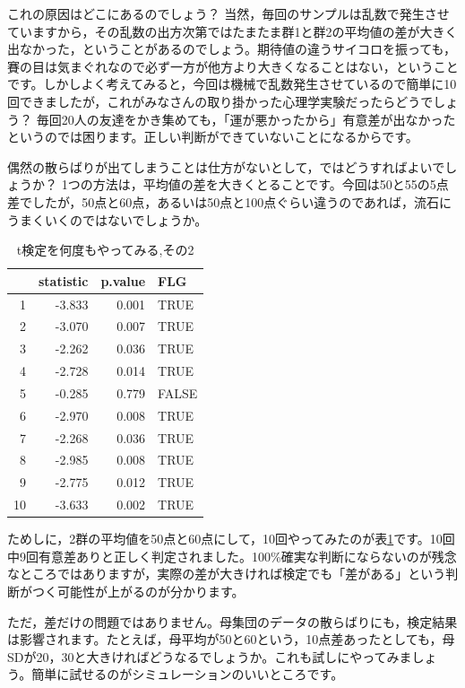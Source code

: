 \documentclass{ltjsarticle}
\begin{document}
{これの原因はどこにあるのでしょう？ 当然，毎回のサンプルは乱数で発生させていますから，その乱数の出方次第ではたまたま群1と群2の平均値の差が大きく出なかった，ということがあるのでしょう。期待値の違うサイコロを振っても，賽の目は気まぐれなので必ず一方が他方より大きくなることはない，ということです。しかしよく考えてみると，今回は機械で乱数発生させているので簡単に10回できましたが，これがみなさんの取り掛かった心理学実験だったらどうでしょう？ 毎回20人の友達をかき集めても，「運が悪かったから」有意差が出なかったというのでは困ります。正しい判断ができていないことになるからです。

偶然の散らばりが出てしまうことは仕方がないとして，ではどうすればよいでしょうか？ 1つの方法は，平均値の差を大きくとることです。今回は50と55の5点差でしたが，50点と60点，あるいは50点と100点ぐらい違うのであれば，流石にうまくいくのではないでしょうか。


\begin{table}[ht]
	\centering
	\caption{t検定を何度もやってみる,その2}
	\begin{tabular}{rrrl}
		\hline
		   & statistic & p.value & FLG   \\
		\hline
		1  & -3.833    & 0.001   & TRUE  \\
		2  & -3.070    & 0.007   & TRUE  \\
		3  & -2.262    & 0.036   & TRUE  \\
		4  & -2.728    & 0.014   & TRUE  \\
		5  & -0.285    & 0.779   & FALSE \\
		6  & -2.970    & 0.008   & TRUE  \\
		7  & -2.268    & 0.036   & TRUE  \\
		8  & -2.985    & 0.008   & TRUE  \\
		9  & -2.775    & 0.012   & TRUE  \\
		10 & -3.633    & 0.002   & TRUE  \\
		\hline
	\end{tabular}
	\label{tbl::19_04}
\end{table}

ためしに，2群の平均値を50点と60点にして，10回やってみたのが表\ref{tbl::19_04}です。10回中9回有意差ありと正しく判定されました。100\%確実な判断にならないのが残念なところではありますが，実際の差が大きければ検定でも「差がある」という判断がつく可能性が上がるのが分かります。

ただ，差だけの問題ではありません。母集団のデータの散らばりにも，検定結果は影響されます。たとえば，母平均が50と60という，10点差あったとしても，母SDが20，30と大きければどうなるでしょうか。これも試しにやってみましょう。簡単に試せるのがシミュレーションのいいところです。

}
\end{document}
